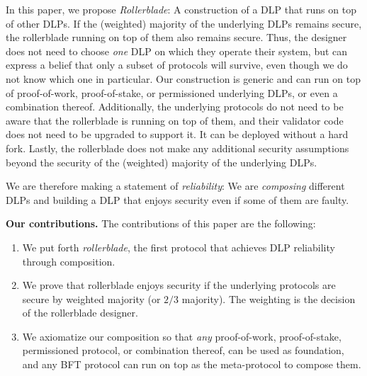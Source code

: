 In this paper, we propose \emph{Rollerblade}: A construction of a DLP
that runs on top of other DLPs. If the (weighted)
majority of the underlying DLPs remains secure, the rollerblade running
on top of them also remains secure. Thus, the designer does not need to choose \emph{one}
DLP on which they operate their system, but can express a belief that only a subset of
protocols will survive, even though we do not know which one in particular. Our
construction is generic and can run on top of proof-of-work, proof-of-stake, or
permissioned underlying DLPs, or even a combination thereof.
Additionally, the underlying protocols do not need to be aware that the rollerblade
is running on top of them, and their validator code does not need to be upgraded
to support it. It can be deployed without a hard fork.
Lastly, the rollerblade does not make any additional security
assumptions beyond the security of the (weighted) majority of the underlying
DLPs.

We are therefore making a statement of \emph{reliability}: We are \emph{composing}
different DLPs and building a DLP that enjoys security even if some of them
are faulty.

\noindent
\textbf{Our contributions.} The contributions of this paper are the following:

\begin{enumerate}
  \item We put forth \emph{rollerblade}, the first protocol that achieves DLP
        reliability through composition.
  \item We prove that rollerblade enjoys security if the underlying protocols
        are secure by weighted majority (or $2/3$ majority).
        The weighting is the decision of the rollerblade designer.
  \item We axiomatize our composition so that \emph{any} proof-of-work, proof-of-stake,
        permissioned protocol, or combination thereof, can be used as foundation,
        and any BFT protocol can run on top as the meta-protocol to compose them.
\end{enumerate}

